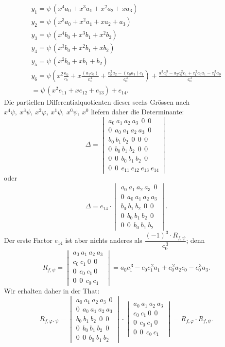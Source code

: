 \documentclass[11pt]{article}
\begin{document}
\begin{gather*}
y_1 = \psi\,(x^4a_0+x^3a_1+x^2a_2+xa_3)\\
y_2 = \psi\,(x^3a_0+x^2a_1+xa_2+a_3)\\
y_3 = \psi\,(x^4b_0+x^3b_1+x^2b_2)\\
y_4 = \psi\,(x^3b_0+x^2b_1+xb_2)\\
y_5 = \psi\,(x^2b_0+xb_1+b_2)\\
y_6 = \psi\left(x^2\frac{a_0}{c_0}+x\frac{(a_1c_0)}{c_0^{\,2}}+\frac{c_0^{\,2}a_2-(c_0a_1)c_1}{c_0^{\,3}}\right)+\frac{a^3c_0^{\,3}-a_2c_0^{\,2}c_1+c_1^{\,2}c_0a_1-c_1^{\,3}a_0}{c_0^{\,3}} %
\\
= \psi\,(x^2e_{11}+xe_{12}+e_{13})+e_{14}.
\end{gather*}
Die partiellen Differentialquotienten dieser sechs Gr\"ossen nach $x^4\psi,\ x^3\psi,\ x^2\varphi,\ x^1\psi,\ x^0\psi,\ x^0$ liefern daher die Determinante:
\[
\varDelta =
\begin{vmatrix}
a_0\ a_1\ a_2\ a_3\ \ 0\ \ 0\\
0\ \ a_0\ a_1\ a_2\ a_3\ \ 0\\
b_0\ b_1\ b_2\ \ 0\ \ 0\ \ 0\\
0\ \ b_0\ b_1\ b_2\ \ 0\ \ 0\\
0\ \ 0\ \ b_0\ b_1\ b_2\ \ 0\\
0\ \ 0\ \ e_{11}\ e_{12}\ e_{13}\ e_{14}
\end{vmatrix}
\]
oder
\[
\varDelta = e_{14}\cdot
\begin{vmatrix}
a_0\ a_1\ a_2\ a_3\ \ 0\\
0\ \ a_0\ a_1\ a_2\ a_3\\
b_0\ b_1\ b_2\ \ 0\ \ 0\\
0\ \ b_0\ b_1\ b_2\ \ 0\\
0\ \ 0\ \ b_0\ b_1\ b_2
\end{vmatrix}.
\]
Der erste Factor $e_{14}$ ist aber nichts anderes als $\dfrac{(-1)^3\cdot R_{f,\psi}}{c_0^{\,3}}$; denn
\[
R_{f,\psi} =
\begin{vmatrix}
a_0\ a_1\ a_2\ a_3\\
c_0\ c_1\ 0\ \ 0\\
0\ \ c_0\ c_1\ 0\\
0\ \ 0\ \ c_0\ c_1
\end{vmatrix}
= a_0c_1^{\,3} - c_0c_1^{\,2}a_1 + c_0^{\,2}a_2c_0 - c_0^{\,3}a_3. %
\]
Wir erhalten daher in der That:
\[
R_{f,\varphi\cdot\psi} =
\begin{vmatrix}
a_0\ a_1\ a_2\ a_3\ \ 0\\
0\ \ a_0\ a_1\ a_2\ a_3\\
b_0\ b_1\ b_2\ \ 0\ \ 0\\
0\ \ b_0\ b_1\ b_2\ \ 0\\
0\ \ 0\ \ b_0\ b_1\ b_2
\end{vmatrix}
\cdot
\begin{vmatrix}
a_0\ a_1\ a_2\ a_3\\
c_0\ c_1\ 0\ \ 0\\
0\ \ c_0\ c_1\ 0\\
0\ \ 0\ \ c_0\ c_1
\end{vmatrix}
= R_{f,\varphi}\cdot R_{f,\psi}.
\]
\end{document}
